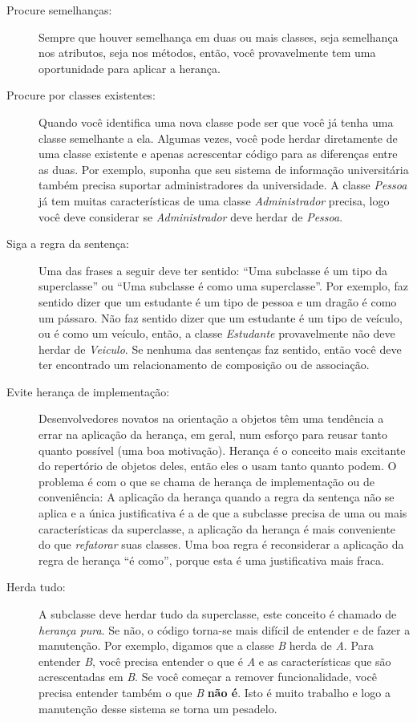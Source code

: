 \begin{description}
\item[Procure semelhanças:] Sempre que houver semelhança em duas ou mais classes, seja semelhança nos atributos, seja nos métodos, então, você provavelmente tem uma oportunidade para aplicar a herança.

\item[Procure por classes existentes:] Quando você identifica uma nova classe pode ser que você já tenha uma classe semelhante a ela. Algumas vezes, você pode herdar diretamente de uma classe existente e apenas acrescentar código para as diferenças entre as duas. Por exemplo, suponha que seu sistema de informação universitária também precisa suportar administradores da universidade. A classe \emph{Pessoa} já tem muitas características de uma classe \emph{Administrador} precisa, logo você deve considerar se \emph{Administrador} deve herdar de \emph{Pessoa}.

\item[Siga a regra da sentença:] Uma das frases a seguir deve ter sentido: ``Uma subclasse é um tipo da superclasse'' ou ``Uma subclasse é como uma superclasse''. Por exemplo, faz sentido dizer que um estudante é um tipo de pessoa e um dragão é como um pássaro. Não faz sentido dizer que um estudante é um tipo de veículo, ou é como um veículo, então, a classe \emph{Estudante} provavelmente não deve herdar de \emph{Veiculo}. Se nenhuma das sentenças faz sentido, então você deve ter encontrado um relacionamento de composição ou de associação.

\item[Evite herança de implementação:] Desenvolvedores novatos na orientação a objetos têm uma tendência a errar na aplicação da herança, em geral, num esforço para reusar tanto quanto possível (uma boa motivação). Herança é o conceito mais excitante do repertório de objetos deles, então eles o usam tanto quanto podem. O problema é com o que se chama de herança de implementação ou de conveniência: A aplicação da herança quando a regra da sentença não se aplica e a única justificativa é a de que a subclasse precisa de uma ou mais características da superclasse, a aplicação da herança é mais conveniente do que \textit{refatorar} suas classes. Uma boa regra é reconsiderar a aplicação da regra de herança ``é como'', porque esta é uma justificativa mais fraca.

\item[Herda tudo:] A subclasse deve herdar tudo da superclasse, este conceito é chamado de \emph{herança pura}. Se não, o código torna-se mais difícil de entender e de fazer a manutenção. Por exemplo, digamos que a classe \emph{B} herda de \emph{A}. Para entender \emph{B}, você precisa entender o que é \emph{A} e as características que são acrescentadas em \emph{B}. Se você começar a remover funcionalidade, você precisa entender também o que \emph{B} \textbf{não é}. Isto é muito trabalho e logo a manutenção desse sistema se torna um pesadelo.

\end{description}

